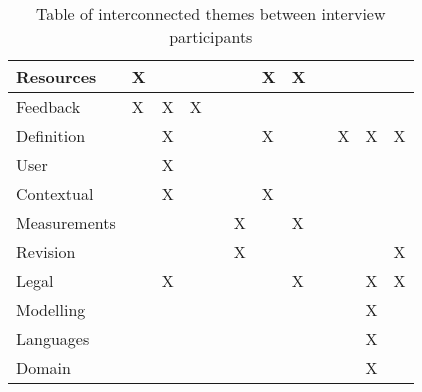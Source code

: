 \begin{table}[H]
{\begin{tabular}{|l|l|l|l|l|l|l|l|l|l|l|l|}
Resources                       & X   &     &     &     &     & X   & X   &     &     &      &      \\ \hline
Feedback                        & X   & X   & X   &     &     &     &     &     &     &      &      \\ \hline
Definition                      &     & X   &     &     &     & X   &     &     & X   & X    & X    \\ \hline
User                            &     & X   &     &     &     &     &     &     &     &      &      \\ \hline
Contextual                      &     & X   &     &     &     & X   &     &     &     &      &      \\ \hline
Measurements                    &     &     &     &     & X   &     & X   &     &     &      &      \\ \hline
Revision                        &     &     &     &     & X   &     &     &     &     &      & X    \\ \hline
Legal                           &     & X   &     &     &     &     & X   &     &     & X    & X    \\ \hline
Modelling                       &     &     &     &     &     &     &     &     &     & X    &      \\ \hline
Languages                       &     &     &     &     &     &     &     &     &     & X    &      \\ \hline
Domain                          &     &     &     &     &     &     &     &     &     & X    &      \\ \hline
\end{tabular}%
}
\caption{Table of interconnected themes between interview participants}
\label{tab:interconnected_themes}
\end{table}


